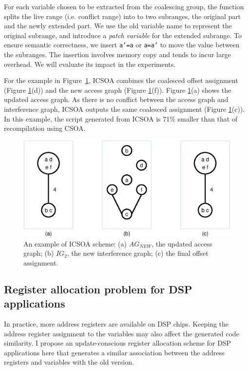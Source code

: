 For each variable chosen to be extracted from the coalescing group, the function splits the live range (i.e. conflict range) into to two subranges, the original part and the newly extended part. We use the old variable name to represent the original subrange, and introduce a {\em patch variable} for the extended subrange. To ensure semantic correctness, we insert {\tt a'=a} or {\tt a=a'} to move the value between the subranges. The insertion involves memory copy and tends to incur large overhead. We will evaluate its impact in the experiments.
 
For the example in Figure~\ref{icsoa}, ICSOA combines the coalesced offset assignment (Figure \ref{icsoa}(d)) and the new access graph (Figure \ref{icsoa}(f)). Figure \ref{icsoa}(a) shows the updated access graph. As there is no conflict between the access graph and interference graph, ICSOA outputs the same coalesced assignment (Figure \ref{icsoa}(c)). In this example, the script generated from ICSOA is 71\% smaller than that of recompilation using CSOA.

\begin{figure}[htbp]
\begin{center}
\includegraphics[scale=0.5]{./figures/icsoa.eps}
\caption{An example of ICSOA scheme:
(a) $\textit{AG}_\textit{NEW}$, the updated access graph;
(b) $\textit{IG}_2$, the new interference graph;
(c) the final offset assignment.}
\label{icsoa}
\end{center}
\vspace{-0.15in}
\end{figure}

\subsection{Register allocation problem for DSP applications}
In practice, more address registers are available on DSP chips. Keeping the address register assignment to the variables may also affect the generated code similarity.
I propose an update-conscious register allocation scheme for DSP applications here that generates a similar association between the address registers and variables
with the old version.

